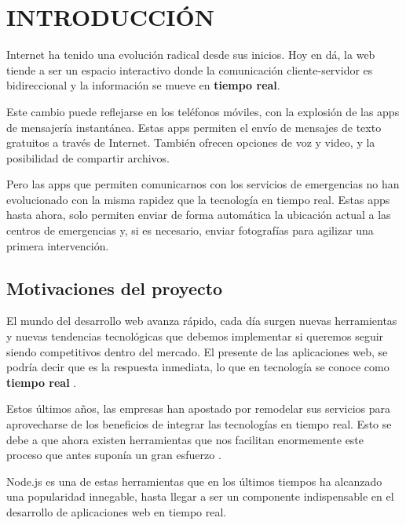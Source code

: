 \chapter{INTRODUCCIÓN}

\clearpage

Internet ha tenido una evolución radical desde sus inicios. Hoy en dá, la web tiende a ser un espacio interactivo donde la comunicación cliente-servidor es bidireccional y la información se mueve en \textbf{tiempo real}.

Este cambio puede reflejarse en los teléfonos móviles, con la explosión de las apps de mensajería instantánea. Estas apps permiten el envío de mensajes de texto gratuitos a través de Internet. También ofrecen opciones de voz y video, y la posibilidad de compartir archivos.

Pero las apps que permiten comunicarnos con los servicios de emergencias no han evolucionado con la misma rapidez que la tecnología en tiempo real. Estas apps hasta ahora, solo permiten enviar de forma automática la ubicación actual a las centros de emergencias y, si es necesario, enviar fotografías para agilizar una primera intervención.

\section{Motivaciones del proyecto}


El mundo del desarrollo web avanza rápido, cada día surgen nuevas herramientas y nuevas tendencias tecnológicas que debemos implementar si queremos seguir siendo competitivos dentro del mercado. El presente de las aplicaciones web, se podría decir que es la respuesta inmediata, lo que en tecnología se conoce como \textbf{tiempo real} \cite{nodejs10}.

Estos últimos años, las empresas han apostado por remodelar sus servicios para aprovecharse de los beneficios de integrar las tecnologías en tiempo real. Esto se debe a que ahora existen herramientas que nos facilitan enormemente este proceso que antes suponía un gran esfuerzo \cite{app7}.

Node.js es una de estas herramientas que en los últimos tiempos ha alcanzado una popularidad innegable, hasta llegar a ser un componente indispensable en el desarrollo de aplicaciones web en tiempo real.

